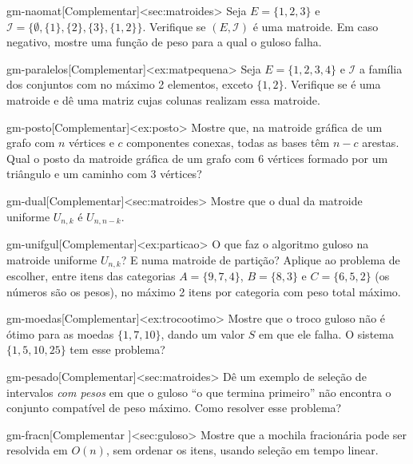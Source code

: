 \begin{exercicio}{gm-naomat}[Complementar]<sec:matroides>
Seja $E=\{1,2,3\}$ e $\mathcal I=\{\emptyset,\{1\},\{2\},\{3\},\{1,2\}\}$. Verifique se $(E,\mathcal I)$ é uma matroide. Em caso negativo, mostre uma função de peso para a qual o guloso falha.
\end{exercicio}
\begin{exercicio}{gm-paralelos}[Complementar]<ex:matpequena>
Seja $E=\{1,2,3,4\}$ e $\mathcal I$ a família dos conjuntos com no máximo 2 elementos, exceto $\{1,2\}$. Verifique se é uma matroide e dê uma matriz cujas colunas realizam essa matroide.
\end{exercicio}
\begin{exercicio}{gm-posto}[Complementar]<ex:posto>
Mostre que, na matroide gráfica de um grafo com $n$ vértices e $c$ componentes conexas, todas as bases têm $n-c$ arestas. Qual o posto da matroide gráfica de um grafo com 6 vértices formado por um triângulo e um caminho com 3 vértices?
\end{exercicio}
\begin{exercicio}{gm-dual}[Complementar]<sec:matroides>
Mostre que o dual da matroide uniforme $U_{n,k}$ é $U_{n,n-k}$.
\end{exercicio}
\begin{exercicio}{gm-unifgul}[Complementar]<ex:particao>
O que faz o algoritmo guloso na matroide uniforme $U_{n,k}$? E numa matroide de partição? Aplique ao problema de escolher, entre itens das categorias $A=\{9,7,4\}$, $B=\{8,3\}$ e $C=\{6,5,2\}$ (os números são os pesos), no máximo 2 itens por categoria com peso total máximo.
\end{exercicio}
\begin{exercicio}{gm-moedas}[Complementar]<ex:trocootimo>
Mostre que o troco guloso não é ótimo para as moedas $\{1,7,10\}$, dando um valor $S$ em que ele falha. O sistema $\{1,5,10,25\}$ tem esse problema?
\end{exercicio}
\begin{exercicio}{gm-pesado}[Complementar]<sec:matroides>
Dê um exemplo de seleção de intervalos \emph{com pesos} em que o guloso ``o que termina primeiro'' não encontra o conjunto compatível de peso máximo. Como resolver esse problema?
\end{exercicio}
\begin{exercicio}{gm-fracn}[Complementar \estrela]<sec:guloso>
Mostre que a mochila fracionária pode ser resolvida em $O(n)$, sem ordenar os itens, usando seleção em tempo linear.
\end{exercicio}
